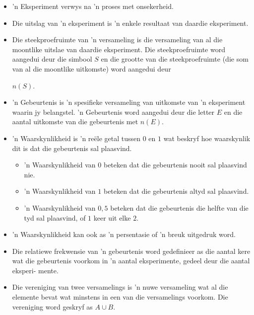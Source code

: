 \begin{itemize}
\item ’n Eksperiment verwys na ’n proses met onsekerheid.

\item Die uitslag van ’n eksperiment is ’n enkele resultaat van daardie eksperiment.


\item Die steekproefruimte van ’n versameling is die versameling van al die moontlike uitslae
van daardie eksperiment. Die steekproefruimte word aangedui deur die simbool $S$ en
die grootte van die steekproefruimte (die som van al die moontlike uitkomste) word
aangedui deur

  $n(S)$.

\item ’n Gebeurtenis is ’n spesifieke versameling van uitkomste van ’n eksperiment waarin
jy belangstel. ’n Gebeurtenis word aangedui deur die letter $E$ en die aantal uitkomste
van die gebeurtenis met
 $n(E)$.

\item ’n Waarskynlikheid is ’n reële getal tussen $0$ en $1$ wat beskryf hoe waarskynlik dit is
dat die gebeurtenis sal plaasvind.

\begin{itemize}
\item ’n Waarskynlikheid van $0$ beteken dat die gebeurtenis nooit sal plaasvind nie.

\item ’n Waarskynlikheid van $1$ beteken dat die gebeurtenis altyd sal plaasvind.

\item ’n Waarskynlikheid van $0,5$ beteken dat die gebeurtenis die helfte van die tyd sal plaasvind, of
$1$ keer uit elke $2$.

\end{itemize}

\item ’n Waarskynlikheid kan ook as 'n persentasie of 'n breuk uitgedruk word.

\item Die relatiewe frekwensie van ’n gebeurtenis word gedefinieer as die aantal kere wat
die gebeurtenis voorkom in ’n aantal eksperimente, gedeel deur die aantal eksperi-
mente.


\item Die vereniging van twee versamelings is ’n nuwe versameling wat al die elemente
bevat wat minstens in een van die versamelings voorkom. Die vereniging word
geskryf as
 $A \cup B$.


\end{itemize}
